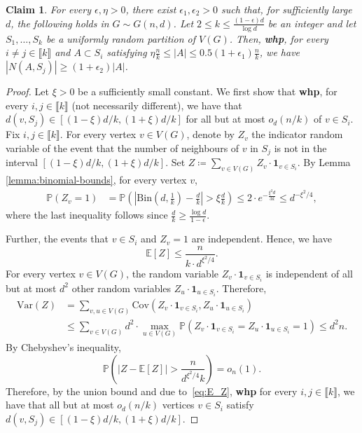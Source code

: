 \documentclass[notitlepage]{scrartcl}
\newcommand{\br}[1]{\llbracket{#1}\rrbracket}
\newtheorem{claim}[thm]{Claim}
\renewcommand{\Pr}{\mathbb{P}}
\begin{document}
\begin{claim}\label{claim:typical neighbourhood-S}      
    For every $\epsilon, \eta > 0$, there exist $\epsilon_1, \epsilon_2 > 0$ such that, for sufficiently large $d$, the following holds in $G \sim G(n, d)$. Let $2\le k \le \frac{(1-\epsilon)d}{\log d}$ be an integer and let $S_1,\ldots, S_k$ be a uniformly random partition of $V(G)$. Then, \textbf{whp}, for every $i \neq j \in \br{k}$ and $A \subset S_i$ satisfying  $\eta \frac{n}{k} \le |A| \le 0.5(1 + \epsilon_1)\frac{n}{k}$, we have
    $|N(A, S_j)| \ge (1 + \epsilon_2) |A|$.    
\end{claim}
\begin{proof}
    Let $\xi > 0$ be a sufficiently small constant. We first show that \textbf{whp}, for every $i, j \in \br{k}$ (not necessarily different), we have that $d(v,S_j)\in[(1-\xi)d/k,(1+\xi)d/k]$ for all but at most $o_d(n/k)$ of $v\in S_i$. Fix $i,j\in \br{k}$. For every vertex $v \in V(G)$, denote by $Z_v$ the indicator random variable of the event that the number of neighbours of $v$ in $S_j$ is not in the interval $[(1-\xi) d/k, (1+\xi) d/k]$. Set $Z \coloneqq \sum_{v \in V(G)} Z_v \cdot \mathbf{1}_{v \in S_i}$. By Lemma \ref{lemma:binomial-bounds}, for every vertex $v$, 
    \begin{align*}
        \Pr\left(Z_v = 1\right) &= \Pr\left(\left|\text{Bin}\left(d, \frac{1}{k}\right) - \frac{d}{k}\right| > \xi \frac{d}{k}\right)\le 2\cdot e^{-\frac{\xi^2d}{3k}}\le  d^{-\xi^2/4},
    \end{align*}
    where the last inequality follows since $\frac{d}{k} \ge \frac{\log d}{1-\epsilon}$.  
    
    Further, the events that $v \in S_i$ and $Z_v = 1$ are independent. Hence, we have \begin{equation}
        \mathbb{E}[Z] \le \frac{n}{k\cdot d^{\xi^2/4}}.
    \label{eq:E_Z}    
    \end{equation}
    For every vertex $v \in V(G)$, the random variable $Z_v \cdot \mathbf{1}_{v \in S_i}$ is independent of all but at most $d^2$ other random variables $Z_u \cdot \mathbf{1}_{u \in S_i}$. Therefore,
    \begin{align*}
        \text{Var}(Z) &= \sum_{v, u \in V(G)} \text{Cov}(Z_v \cdot \mathbf{1}_{v \in S_i}, Z_u \cdot \mathbf{1}_{u \in S_i}) \\
        &\le \sum_{v \in V(G)} d^2 \cdot \max_{u \in V(G)} \Pr\left(Z_v \cdot \mathbf{1}_{v \in S_i} = Z_u \cdot \mathbf{1}_{u \in S_i} = 1\right) \le d^2 n.
    \end{align*}
    By Chebyshev's inequality,
    \[
        \Pr\left(|Z - \mathbb{E}[Z]| > \frac{n}{d^{\xi^2/4} k}\right) = o_n(1).
    \]
    Therefore, by the union bound and due to~\eqref{eq:E_Z}, \textbf{whp} for every $i,j\in\br{k}$, we have that all but at most $o_d(n/k)$ vertices $v\in S_i$ satisfy $d(v,S_j)\in \left[(1-\xi)d/k,(1+\xi)d/k\right]$. 


\end{proof}
\end{document}
